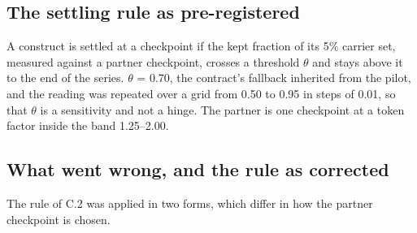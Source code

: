 \documentclass{article}
\begin{document}
\subsection{The settling rule as pre-registered}

A construct is settled at a checkpoint if the kept fraction of its 5\% carrier set, measured against a partner checkpoint, crosses a threshold $\theta$ and stays above it to the end of the series. $\theta$ = 0.70, the contract's fallback inherited from the pilot, and the reading was repeated over a grid from 0.50 to 0.95 in steps of 0.01, so that $\theta$ is a sensitivity and not a hinge. The partner is one checkpoint at a token factor inside the band 1.25--2.00.

\subsection{What went wrong, and the rule as corrected}

The rule of C.2 was applied in two forms, which differ in how the partner checkpoint is chosen.
\end{document}
